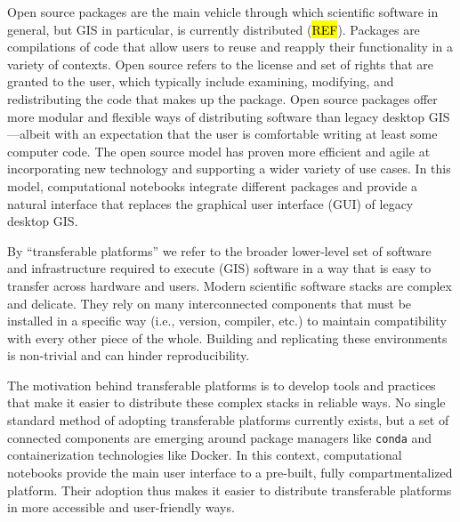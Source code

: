 \documentclass[11pt,letterpaper]{article}
\begin{document}
Open source packages are the main vehicle through which scientific software in general, but GIS in particular, is currently distributed (\hl{REF}). Packages are compilations of code that allow users to reuse and reapply their functionality in a variety of contexts. Open source refers to the license and set of rights that are granted to the user, which typically include examining, modifying, and redistributing the code that makes up the package. Open source packages offer more modular and flexible ways of distributing software than legacy desktop GIS---albeit with an expectation that the user is comfortable writing at least some computer code. The open source model has proven more efficient and agile at incorporating new technology and supporting a wider variety of use cases. In this model, computational notebooks integrate different packages and provide a natural interface that replaces the graphical user interface (GUI) of legacy desktop GIS.

By \enquote{transferable platforms} we refer to the broader lower-level set of software and infrastructure required to execute (GIS) software in a way that is easy to transfer across hardware and users. Modern scientific software stacks are complex and delicate. They rely on many interconnected components that must be installed in a specific way (i.e., version, compiler, etc.) to maintain compatibility with every other piece of the whole. Building and replicating these environments is non-trivial and can hinder reproducibility.

The motivation behind transferable platforms is to develop tools and practices that make it easier to distribute these complex stacks in reliable ways. No single standard method of adopting transferable platforms currently exists, but a set of connected components are emerging around package managers like \texttt{conda} and containerization technologies like Docker. In this context, computational notebooks provide the main user interface to a pre-built, fully compartmentalized platform. Their adoption thus makes it easier to distribute transferable platforms in more accessible and user-friendly ways.
\end{document}
